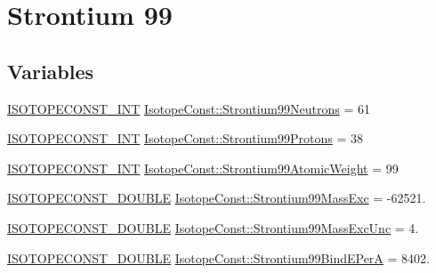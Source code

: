 \hypertarget{group___isotope_const-_strontium-_sr99}{}\section{Strontium 99}
\label{group___isotope_const-_strontium-_sr99}
\subsection*{Variables}
\begin{DoxyCompactItemize}
\item 
\mbox{\hyperlink{group___isotope_const-_macros_ga5f18360b3e99483a35c32d789e62621c}{I\+S\+O\+T\+O\+P\+E\+C\+O\+N\+S\+T\+\_\+\+I\+NT}} \mbox{\hyperlink{group___isotope_const-_strontium-_sr99_gae9f023173ccd068431945dca77998e90}{Isotope\+Const\+::\+Strontium99\+Neutrons}} = 61
\item 
\mbox{\hyperlink{group___isotope_const-_macros_ga5f18360b3e99483a35c32d789e62621c}{I\+S\+O\+T\+O\+P\+E\+C\+O\+N\+S\+T\+\_\+\+I\+NT}} \mbox{\hyperlink{group___isotope_const-_strontium-_sr99_ga9696f289571fae75413a09143ca380c6}{Isotope\+Const\+::\+Strontium99\+Protons}} = 38
\item 
\mbox{\hyperlink{group___isotope_const-_macros_ga5f18360b3e99483a35c32d789e62621c}{I\+S\+O\+T\+O\+P\+E\+C\+O\+N\+S\+T\+\_\+\+I\+NT}} \mbox{\hyperlink{group___isotope_const-_strontium-_sr99_ga7dd2faa4528577e832e9e8a42e04d9eb}{Isotope\+Const\+::\+Strontium99\+Atomic\+Weight}} = 99
\item 
\mbox{\hyperlink{group___isotope_const-_macros_ga8f45a7272ce02c0b4c65c44636ed719a}{I\+S\+O\+T\+O\+P\+E\+C\+O\+N\+S\+T\+\_\+\+D\+O\+U\+B\+LE}} \mbox{\hyperlink{group___isotope_const-_strontium-_sr99_ga060a2647b590bc34ffbee38730633c64}{Isotope\+Const\+::\+Strontium99\+Mass\+Exc}} = -\/62521.
\item 
\mbox{\hyperlink{group___isotope_const-_macros_ga8f45a7272ce02c0b4c65c44636ed719a}{I\+S\+O\+T\+O\+P\+E\+C\+O\+N\+S\+T\+\_\+\+D\+O\+U\+B\+LE}} \mbox{\hyperlink{group___isotope_const-_strontium-_sr99_gabe0f3286ce8a1790af337f899c183f85}{Isotope\+Const\+::\+Strontium99\+Mass\+Exc\+Unc}} = 4.
\item 
\mbox{\hyperlink{group___isotope_const-_macros_ga8f45a7272ce02c0b4c65c44636ed719a}{I\+S\+O\+T\+O\+P\+E\+C\+O\+N\+S\+T\+\_\+\+D\+O\+U\+B\+LE}} \mbox{\hyperlink{group___isotope_const-_strontium-_sr99_ga1795324734f2225df7ef7b45bd439bc2}{Isotope\+Const\+::\+Strontium99\+Bind\+E\+PerA}} = 8402.
\item 

\end{DoxyCompactItemize}
